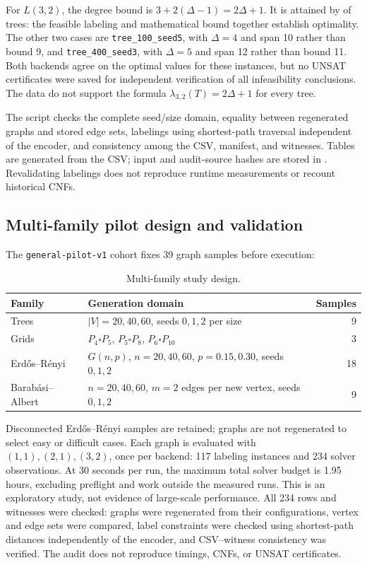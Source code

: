 For $L(3,2)$, the degree bound is $3+2(\Delta-1)=2\Delta+1$.
It is attained by \TreeTightCount{} of \TreeGraphCount{} trees: the feasible
labeling and mathematical bound together establish optimality. The other
two cases are \texttt{tree\_100\_seed5}, with $\Delta=4$ and span 10 rather
than bound 9, and \texttt{tree\_400\_seed3}, with $\Delta=5$ and span 12
rather than bound 11. Both backends agree on the optimal values for these
instances, but no UNSAT certificates were saved for independent verification
of all infeasibility conclusions. The data do not support the formula
$\lambda_{3,2}(T)=2\Delta+1$ for every tree.

The script  checks the complete seed/size
domain, equality between regenerated graphs and stored edge sets, labelings
using shortest-path traversal independent of the encoder, and consistency
among the CSV, manifest, and witnesses. Tables are generated from the CSV;
input and audit-source hashes are stored in
. Revalidating labelings
does not reproduce runtime measurements or recount historical CNFs.

\subsection{Multi-family pilot design and validation}
The \texttt{general-pilot-v1} cohort fixes 39 graph samples before execution:
\begin{table}[H]
\caption{Multi-family study design.}
\centering\small

\label{tab:planned-cohort}
\begin{tabular}{p{3.0cm}p{9.0cm}r}
\toprule
Family & Generation domain & Samples\\\midrule
Trees & $|V|=20,40,60$, seeds $0,1,2$ per size & 9\\
Grids & $P_4\square P_5$, $P_5\square P_8$, $P_6\square P_{10}$ & 3\\
Erdős--Rényi & $G(n,p)$, $n=20,40,60$, $p=0.15,0.30$, seeds $0,1,2$ & 18\\
Barabási--Albert & $n=20,40,60$, $m=2$ edges per new vertex, seeds $0,1,2$ & 9\\
\bottomrule
\end{tabular}
\end{table}
Disconnected Erdős--Rényi samples are retained; graphs are not regenerated
to select easy or difficult cases. Each graph is evaluated with $(1,1),(2,1),(3,2)$,
once per backend: 117 labeling instances and 234 solver observations.
At 30 seconds per run, the maximum total solver budget is 1.95 hours,
excluding preflight and work outside the measured runs. This is an exploratory
study, not evidence of large-scale performance.
All 234 rows and witnesses were checked: graphs were regenerated from their
configurations, vertex and edge sets were compared, label constraints were
checked using shortest-path distances independently of the encoder, and
CSV--witness consistency was verified. The audit does not reproduce timings,
CNFs, or UNSAT certificates.


